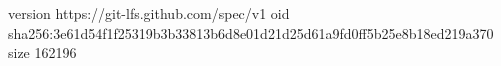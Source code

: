 version https://git-lfs.github.com/spec/v1
oid sha256:3e61d54f1f25319b3b33813b6d8e01d21d25d61a9fd0ff5b25e8b18ed219a370
size 162196

